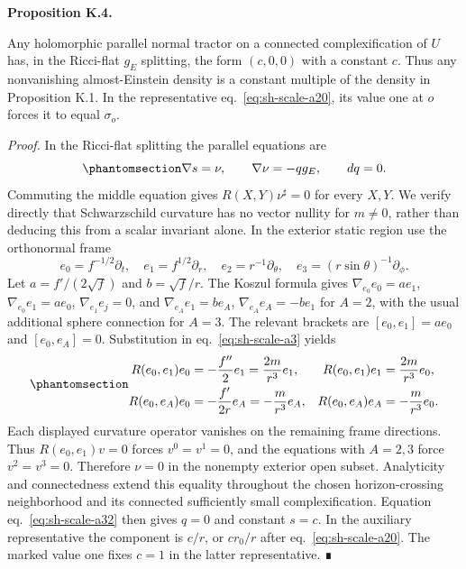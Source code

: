 \documentclass[
  english,
  11pt,
  reqno]{amsart}
\makeatletter
\newcounter{none} %
\newcommand{\pandocstatementheading}[1]{%
  \par\addpenalty{\@beginparpenalty}%
  \addvspace{.5\baselineskip plus .2\baselineskip minus .2\baselineskip}%
  {\normalfont\bfseries #1\par}%
  \nobreak\@afterindenttrue\@afterheading
}
\makeatother
\begin{document}
\pandocstatementheading{\protect{}\label{prop:sh-scale-4}Proposition K.4.}

Any holomorphic parallel normal tractor on a connected complexification
of \(U\) has, in the Ricci-flat \(g_E\) splitting, the form \((c,0,0)\)
with a constant \(c\). Thus any nonvanishing almost-Einstein density is
a constant multiple of the density in Proposition K.1. In the
representative eq.~\ref{eq:sh-scale-a20}, its value one at \(o\) forces
it to equal \(\sigma_o\).

\emph{Proof.} In the Ricci-flat splitting the parallel equations are
\begin{equation}\protect\phantomsection\label{eq:sh-scale-a32}{
\nabla s=\nu,\qquad \nabla\nu=-qg_E,\qquad dq=0.
}\end{equation} Commuting the middle equation gives
\(R(X,Y)\nu^\sharp=0\) for every \(X,Y\). We verify directly that
Schwarzschild curvature has no vector nullity for \(m\ne0\), rather than
deducing this from a scalar invariant alone. In the exterior static
region use the orthonormal frame \[
e_0=f^{-1/2}\partial_t,\quad e_1=f^{1/2}\partial_r,\quad
e_2=r^{-1}\partial_\theta,\quad e_3=(r\sin\theta)^{-1}\partial_\phi.
\] Let \(a=f'/(2\sqrt f)\) and \(b=\sqrt f/r\). The Koszul formula gives
\(\nabla_{e_0}e_0=ae_1\), \(\nabla_{e_0}e_1=ae_0\),
\(\nabla_{e_1}e_j=0\), and \(\nabla_{e_A}e_1=be_A\),
\(\nabla_{e_A}e_A=-be_1\) for \(A=2\), with the usual additional sphere
connection for \(A=3\). The relevant brackets are \([e_0,e_1]=ae_0\) and
\([e_0,e_A]=0\). Substitution in eq.~\ref{eq:sh-scale-a3} yields
\begin{equation}\protect\phantomsection\label{eq:sh-scale-a33}{
\begin{aligned}
R(e_0,e_1)e_0&=-\frac{f''}{2}e_1=\frac{2m}{r^3}e_1,&
R(e_0,e_1)e_1&=\frac{2m}{r^3}e_0,\\
R(e_0,e_A)e_0&=-\frac{f'}{2r}e_A=-\frac m{r^3}e_A,&
R(e_0,e_A)e_A&=-\frac m{r^3}e_0.
\end{aligned}
}\end{equation} Each displayed curvature operator vanishes on the
remaining frame directions. Thus \(R(e_0,e_1)v=0\) forces \(v^0=v^1=0\),
and the equations with \(A=2,3\) force \(v^2=v^3=0\). Therefore
\(\nu=0\) in the nonempty exterior open subset. Analyticity and
connectedness extend this equality throughout the chosen
horizon-crossing neighborhood and its connected sufficiently small
complexification. Equation eq.~\ref{eq:sh-scale-a32} then gives \(q=0\)
and constant \(s=c\). In the auxiliary representative the component is
\(c/r\), or \(cr_0/r\) after eq.~\ref{eq:sh-scale-a20}. The marked value
one fixes \(c=1\) in the latter representative. ∎
\end{document}
